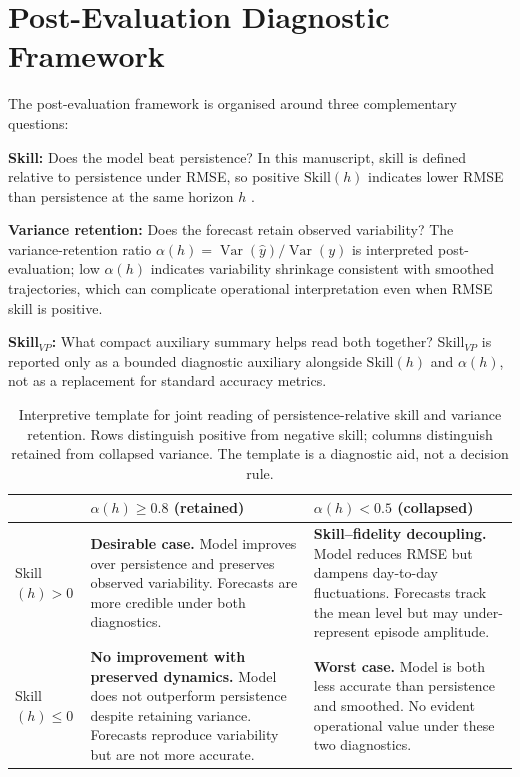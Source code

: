 \documentclass[3p,times,single-column]{elsarticle}
\begin{document}
\section{Post-Evaluation Diagnostic Framework}

The post-evaluation framework is organised around three complementary questions:

\textbf{Skill:} Does the model beat persistence? In this manuscript, skill is defined relative to persistence under RMSE, so positive \(\mathrm{Skill}(h)\) indicates lower RMSE than persistence at the same horizon \(h\) \cite{hyndman2006,tashman2000}.

\textbf{Variance retention:} Does the forecast retain observed variability? The variance-retention ratio \(\alpha(h)=\operatorname{Var}(\hat{y})/\operatorname{Var}(y)\) is interpreted post-evaluation; low \(\alpha(h)\) indicates variability shrinkage consistent with smoothed trajectories, which can complicate operational interpretation even when RMSE skill is positive.

\textbf{Skill$_{VP}$:} What compact auxiliary summary helps read both together? Skill$_{VP}$ is reported only as a bounded diagnostic auxiliary alongside \(\mathrm{Skill}(h)\) and \(\alpha(h)\), not as a replacement for standard accuracy metrics.

\begin{table}[ht]
\centering
\caption{Interpretive template for joint reading of persistence-relative skill and variance retention. Rows distinguish positive from negative skill; columns distinguish retained from collapsed variance. The template is a diagnostic aid, not a decision rule.}
\label{tab:interpretive}
\begin{tabular}{>{\raggedright\arraybackslash}p{3cm}>{\raggedright\arraybackslash}p{5.5cm}>{\raggedright\arraybackslash}p{5.5cm}}
\hline
 & $\alpha(h) \geq 0.8$ (retained) & $\alpha(h) < 0.5$ (collapsed) \\
\hline
Skill$(h) > 0$ & \textbf{Desirable case.} Model improves over persistence and preserves observed variability. Forecasts are more credible under both diagnostics. & \textbf{Skill--fidelity decoupling.} Model reduces RMSE but dampens day-to-day fluctuations. Forecasts track the mean level but may under-represent episode amplitude. \\[6pt]
Skill$(h) \leq 0$ & \textbf{No improvement with preserved dynamics.} Model does not outperform persistence despite retaining variance. Forecasts reproduce variability but are not more accurate. & \textbf{Worst case.} Model is both less accurate than persistence and smoothed. No evident operational value under these two diagnostics. \\
\hline
\end{tabular}
\end{table}
\end{document}
